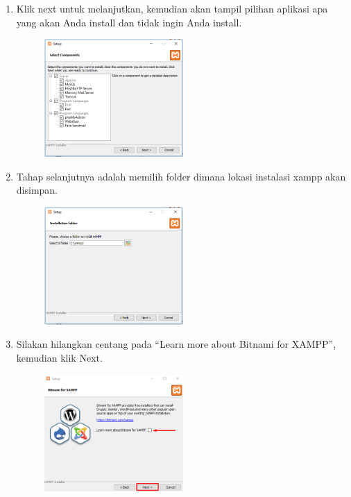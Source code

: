 \begin{enumerate}
	\item Klik next untuk melanjutkan, kemudian akan tampil pilihan aplikasi apa yang akan Anda install dan tidak ingin Anda install.
		\begin{figure}[!htbp]
    		\centering
    		\includegraphics[width=0.5\textwidth]{figures/XAMPP/Xampp4.PNG}
    		\label{Xampp4}
		\end{figure}
		
	\item Tahap selanjutnya adalah memilih folder dimana lokasi instalasi xampp akan disimpan.
		\begin{figure}[!htbp]
    		\centering
    		\includegraphics[width=0.5\textwidth]{figures/XAMPP/Xampp5.PNG}
    		\label{Xampp5}
		\end{figure}
		
	\item Silakan hilangkan centang pada “Learn more about Bitnami for XAMPP”, kemudian klik Next.
		\begin{figure}[!htbp]
    		\centering
    		\includegraphics[width=0.5\textwidth]{figures/XAMPP/Xampp6.png}
    		\label{Xampp6}
		\end{figure}
		

\end{enumerate}
